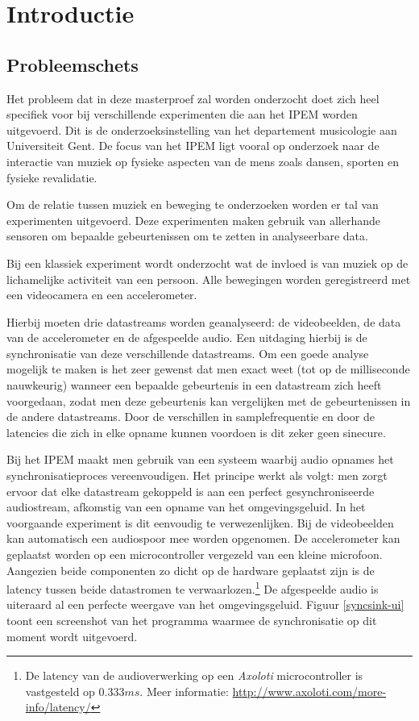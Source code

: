\chapter{Introductie}
\label{introductie}

\section{Probleemschets}
\label{probleemschets}

Het probleem dat in deze masterproef zal worden onderzocht doet zich heel specifiek voor bij verschillende experimenten die aan het IPEM worden uitgevoerd. Dit is de onderzoeksinstelling van het departement musicologie aan Universiteit Gent. De focus van het IPEM ligt vooral op onderzoek naar de interactie van muziek op fysieke aspecten van de mens zoals dansen, sporten en fysieke revalidatie. \cite{ipem2016}

Om de relatie tussen muziek en beweging te onderzoeken worden er tal van experimenten uitgevoerd. Deze experimenten maken gebruik van allerhande sensoren om bepaalde gebeurtenissen om te zetten in analyseerbare data. 

Bij een klassiek experiment wordt onderzocht wat de invloed is van muziek op de lichamelijke activiteit van een persoon. Alle bewegingen worden geregistreerd met een videocamera en een accelerometer.

Hierbij moeten drie datastreams worden geanalyseerd: de videobeelden, de data van de accelerometer en de afgespeelde audio. Een  uitdaging hierbij is de synchronisatie van deze verschillende datastreams. Om een goede analyse mogelijk te maken is het zeer gewenst dat men exact weet (tot op de milliseconde nauwkeurig) wanneer een bepaalde gebeurtenis in een datastream zich heeft voorgedaan, zodat men deze gebeurtenis kan vergelijken met de gebeurtenissen in de andere datastreams. Door de verschillen in samplefrequentie en door de latencies die zich in elke opname kunnen voordoen is dit zeker geen sinecure. \cite{six2015multimodal}

Bij het IPEM maakt men gebruik van een systeem waarbij audio opnames het synchronisatieproces vereenvoudigen. Het principe werkt als volgt: men zorgt ervoor dat elke datastream gekoppeld is aan een perfect gesynchroniseerde audiostream, afkomstig van een opname van het omgevingsgeluid. In het voorgaande experiment is dit eenvoudig te verwezenlijken. Bij de videobeelden kan automatisch een audiospoor mee worden opgenomen. De accelerometer kan geplaatst worden op een microcontroller vergezeld van een kleine microfoon. Aangezien beide componenten zo dicht op de hardware geplaatst zijn is de latency tussen beide datastromen te verwaarlozen.\footnote{De latency van de audioverwerking op een \textit{Axoloti} microcontroller is vastgesteld op $0.333 ms$. Meer informatie: \url{http://www.axoloti.com/more-info/latency/}} De afgespeelde audio is uiteraard al een perfecte weergave van het omgevingsgeluid. Figuur \ref{syncsink-ui} toont een screenshot van het programma waarmee de synchronisatie op dit moment wordt uitgevoerd.

